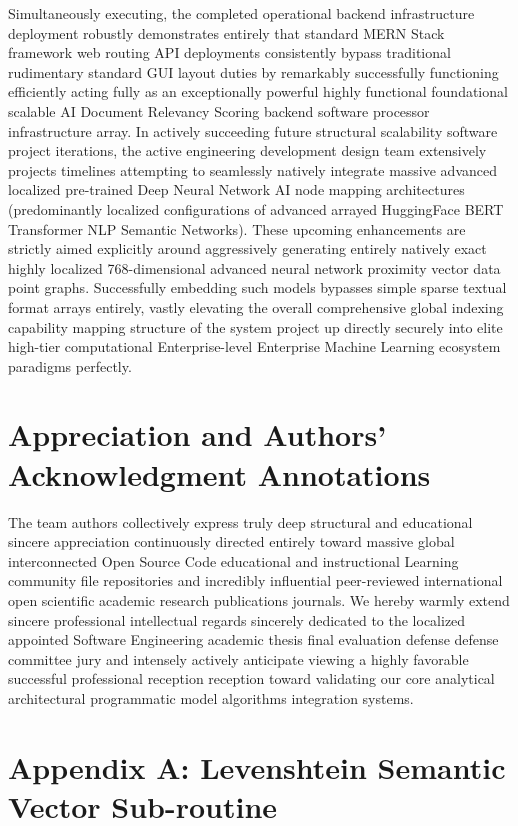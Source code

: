\documentclass[journal]{IEEEtran}
\begin{document}
Simultaneously executing, the completed operational backend infrastructure deployment robustly demonstrates entirely that standard MERN Stack framework web routing API deployments consistently bypass traditional rudimentary standard GUI layout duties by remarkably successfully functioning efficiently acting fully as an exceptionally powerful highly functional foundational scalable AI Document Relevancy Scoring backend software processor infrastructure array. 
In actively succeeding future structural scalability software project iterations, the active engineering development design team extensively projects timelines attempting to seamlessly natively integrate massive advanced localized pre-trained Deep Neural Network AI node mapping architectures (predominantly localized configurations of advanced arrayed HuggingFace BERT Transformer NLP Semantic Networks). 
These upcoming enhancements are strictly aimed explicitly around aggressively generating entirely natively exact highly localized 768-dimensional advanced neural network proximity vector data point graphs. 
Successfully embedding such models bypasses simple sparse textual format arrays entirely, vastly elevating the overall comprehensive global indexing capability mapping structure of the system project up directly securely into elite high-tier computational Enterprise-level Enterprise Machine Learning ecosystem paradigms perfectly.

\section*{Appreciation and Authors' Acknowledgment Annotations}

The team authors collectively express truly deep structural and educational sincere appreciation continuously directed entirely toward massive global interconnected Open Source Code educational and instructional Learning community file repositories and incredibly influential peer-reviewed international open scientific academic research publications journals. 
We hereby warmly extend sincere professional intellectual regards sincerely dedicated to the localized appointed Software Engineering academic thesis final evaluation defense defense committee jury and intensely actively anticipate viewing a highly favorable successful professional reception reception toward validating our core analytical architectural programmatic model algorithms integration systems.

\appendices

\section{Appendix A: Levenshtein Semantic Vector Sub-routine}
\end{document}

